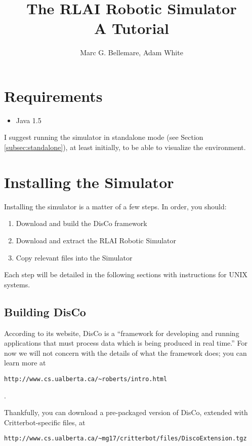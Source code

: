 \documentclass[12pt]{article}
\author{Marc G. Bellemare, Adam White}
\title{The RLAI Robotic Simulator\\ A Tutorial}
\begin{document}
\maketitle

\section{Requirements}

\begin{itemize}
\item{Java 1.5}
\end{itemize}

I suggest running the simulator in standalone mode 
(see Section \ref{subsec:standalone}), at least initially, to be able to 
visualize the environment.

\section{Installing the Simulator}

Installing the simulator is a matter of a few steps. In order, you should:

\begin{enumerate}
\item{Download and build the DisCo framework}
\item{Download and extract the RLAI Robotic Simulator}
\item{Copy relevant files into the Simulator}
\end{enumerate}

Each step will be detailed in the following sections with instructions for
UNIX systems.


\subsection{Building DisCo}

According to its website, DisCo is a ``framework for developing and running 
applications that must process data which is being produced in real time.'' 
For now we will not
concern with the details of what the framework does; you can learn more at
\begin{verbatim}http://www.cs.ualberta.ca/~roberts/intro.html\end{verbatim}.

Thankfully, you can download a pre-packaged version of DisCo, extended with
Critterbot-specific files, at 

\begin{verbatim}
http://www.cs.ualberta.ca/~mg17/critterbot/files/DiscoExtension.tgz
\end{verbatim}
\end{document}
